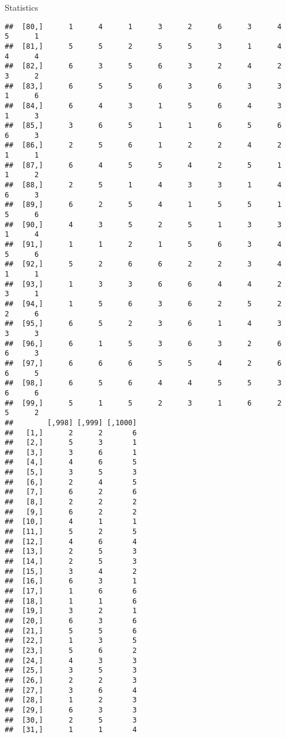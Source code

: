 \documentclass[
  ignorenonframetext,
]{beamer}
\begin{document}
\begin{frame}[fragile]{Statistics}
\begin{verbatim}
##  [80,]      1      4      1      3      2      6      3      4      5      1
##  [81,]      5      5      2      5      5      3      1      4      4      4
##  [82,]      6      3      5      6      3      2      4      2      3      2
##  [83,]      6      5      5      6      3      6      3      3      1      6
##  [84,]      6      4      3      1      5      6      4      3      1      3
##  [85,]      3      6      5      1      1      6      5      6      6      3
##  [86,]      2      5      6      1      2      2      4      2      1      1
##  [87,]      6      4      5      5      4      2      5      1      1      2
##  [88,]      2      5      1      4      3      3      1      4      6      3
##  [89,]      6      2      5      4      1      5      5      1      5      6
##  [90,]      4      3      5      2      5      1      3      3      1      4
##  [91,]      1      1      2      1      5      6      3      4      5      6
##  [92,]      5      2      6      6      2      2      3      4      1      1
##  [93,]      1      3      3      6      6      4      4      2      3      1
##  [94,]      1      5      6      3      6      2      5      2      2      6
##  [95,]      6      5      2      3      6      1      4      3      3      3
##  [96,]      6      1      5      3      6      3      2      6      6      3
##  [97,]      6      6      6      5      5      4      2      6      6      5
##  [98,]      6      5      6      4      4      5      5      3      6      6
##  [99,]      5      1      5      2      3      1      6      2      5      2
##        [,998] [,999] [,1000]
##   [1,]      2      2       6
##   [2,]      5      3       1
##   [3,]      3      6       1
##   [4,]      4      6       5
##   [5,]      3      5       3
##   [6,]      2      4       5
##   [7,]      6      2       6
##   [8,]      2      2       2
##   [9,]      6      2       2
##  [10,]      4      1       1
##  [11,]      5      2       5
##  [12,]      4      6       4
##  [13,]      2      5       3
##  [14,]      2      5       3
##  [15,]      3      4       2
##  [16,]      6      3       1
##  [17,]      1      6       6
##  [18,]      1      1       6
##  [19,]      3      2       1
##  [20,]      6      3       6
##  [21,]      5      5       6
##  [22,]      1      3       5
##  [23,]      5      6       2
##  [24,]      4      3       3
##  [25,]      3      5       3
##  [26,]      2      2       3
##  [27,]      3      6       4
##  [28,]      1      2       3
##  [29,]      6      3       3
##  [30,]      2      5       3
##  [31,]      1      1       4

\end{verbatim}
\end{frame}
\end{document}
